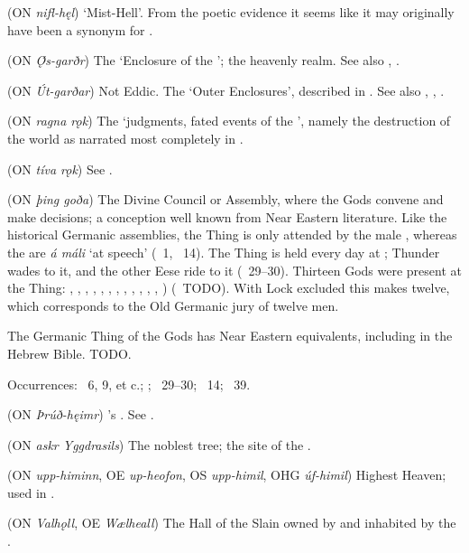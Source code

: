 \begin{itemize}
 (ON \emph{nifl-hęl})
  ‘Mist-Hell’. From the poetic evidence it seems like it may originally have been a synonym for .

 (ON \emph{Ǫ́s-garðr})
  The ‘Enclosure of the ’; the heavenly realm.  See also , .

 (ON \emph{Út-garðar})
  Not Eddic.  The ‘Outer Enclosures’, described in \Gylfaginning. See also , , .

 (ON \emph{ragna rǫk})
  The ‘judgments, fated events of the ’, namely the destruction of the world as narrated most completely in \Voluspa.

 (ON \emph{tíva rǫk})
  See .

 (ON \emph{þing goða})
  The Divine Council or Assembly, where the Gods convene and make decisions; a conception well known from Near Eastern literature.  Like the historical Germanic assemblies, the Thing is only attended by the male , whereas the  are \emph{á máli} ‘at speech’ (\Baldrsdraumar\ 1, \Thrymskvida\ 14).  The Thing is held every day at ; Thunder wades to it, and the other Eese ride to it (\Grimnismal\ 29–30).  Thirteen Gods were present at the Thing: , , , , , , , , , , , , ) (\Gylfaginning\ TODO).  With Lock excluded this makes twelve, which corresponds to the Old Germanic jury of twelve men.

  The Germanic Thing of the Gods has Near Eastern equivalents, including in the Hebrew Bible.  TODO.

  Occurrences: \Voluspa\ 6, 9, et c.; ; \Grimnismal\ 29–30; \Thrymskvida\ 14; \Hymiskvida\ 39.

 (ON \emph{Þrúð-hęimr})
  ’s .  See .

 (ON \emph{askr Yggdrasils})
  The noblest tree; the site of the .

 (ON \emph{upp-himinn}, OE \emph{up-heofon}, OS \emph{upp-himil}, OHG \emph{úf-himil})
  Highest Heaven; used in .

 (ON \emph{Valhǫll}, OE \emph{Wælheall})
  The Hall of the Slain owned by  and inhabited by the .
\end{itemize}

